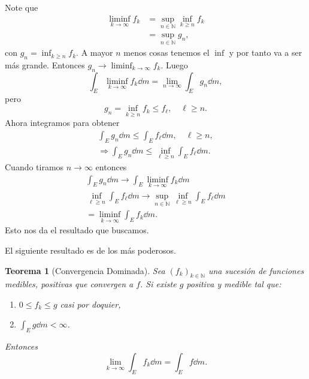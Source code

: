 \documentclass[12pt]{article}
\theoremstyle{plain}
\newtheorem{Th}{Teorema}[subsection]   %
\theoremstyle{definition}
\theoremstyle{remark}
\numberwithin{equation}{section}
\newcommand{\bN}{\mathbb{N}}        %
\renewcommand{\geq}{\geqslant}      %
\renewcommand{\leq}{\leqslant}      %
\renewcommand{\:}{\colon}           %
\begin{document}
\begin{multicols}{2}
\begin{ptcbp}
Note que
\begin{align*}
  \liminf_{k\to\infty}f_k &= \sup_{n\in\bN}\inf_{k\geq n}f_k\\
  &= \sup_{n\in\bN}g_n,
\end{align*}
con $g_n =\inf_{k\geq n}f_k$.
A mayor $n$ menos cosas tenemos el $\inf$ y por tanto va a ser más grande. Entonces $g_n\to\liminf_{k\to\infty}f_k$. Luego
$$\int_E\liminf_{k\to\infty}f_k\dd m=\lim_{n\to\infty}\int_E g_n\dd m,$$
pero
$$g_n=\inf_{k\geq n}f_k\leq f_\ell,\quad \ell\geq n.$$
Ahora integramos para obtener
\begin{gather*}
  \int_Eg_n\dd m\leq \int_E f_\ell\dd m,\quad \ell\geq n,\\
  \Rightarrow\int_Eg_n\dd m\leq \inf_{\ell\geq n}\int_Ef_\ell\dd m.
\end{gather*}
Cuando tiramos $n\to \infty$ entonces
\begin{gather*}
  \int_Eg_n\dd m\to\int_E\liminf_{k\to\infty}f_k\dd m\\
  \inf_{\ell\geq n}\int_Ef_\ell\dd m\to\sup_{n\in\bN}\inf_{\ell\geq n}\int_Ef_\ell\dd m\\
  =\liminf_{k\to\infty}\int_Ef_k\dd m.
\end{gather*}
Esto nos da el resultado que buscamos.
\end{ptcbp}

El siguiente resultado es de los más poderosos.
\begin{Th}[Convergencia Dominada]\label{thm:DCTLebesguePositive}
  Sea $(f_k)_{k\in\bN}$ una sucesión de funciones medibles, positivas que convergen a $f$. Si existe $g$ positiva y medible tal que:
  \begin{enumerate}
    \item $0\leq f_k\leq g$ casi por doquier,
    \item $\int_Eg\dd m<\infty$.
  \end{enumerate}
  Entonces $$\lim_{k\to\infty}\int_Ef_k\dd m=\int_Ef\dd m.$$
\end{Th}


\end{multicols}
\end{document}
